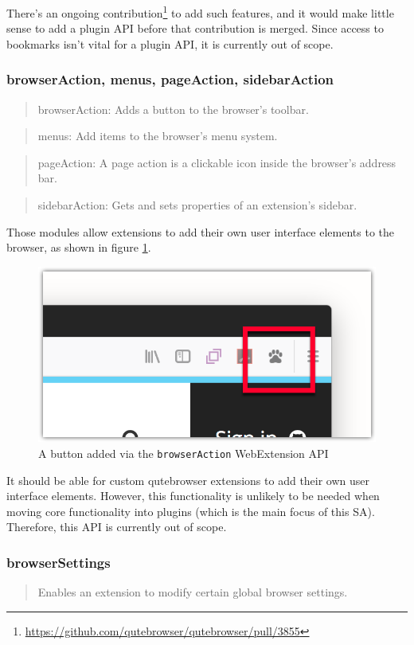 \documentclass[a4paper,parskip=full]{scrreprt}
\begin{document}
There's an ongoing
contribution\footnote{\url{https://github.com/qutebrowser/qutebrowser/pull/3855}}
to add such features, and it would make little sense to add a plugin API before
that contribution is merged. Since access to bookmarks isn't vital for a plugin
API, it is currently out of scope.

\subsubsection{browserAction, menus, pageAction, sidebarAction}
\begin{quote}
browserAction: Adds a button to the browser's toolbar.
\end{quote}
\begin{quote}
menus: Add items to the browser's menu system.
\end{quote}
\begin{quote}
pageAction: A page action is a clickable icon inside the browser's address bar.
\end{quote}
\begin{quote}
sidebarAction: Gets and sets properties of an extension's sidebar.
\end{quote}

Those modules allow extensions to add their own user interface elements to the
browser, as shown in figure \ref{img:browser-action}.

\begin{figure}[h]
  \centering
  \includegraphics[width=0.5\linewidth]{img/browser-action.png}
  \caption{A button added via the \texttt{browserAction} WebExtension API}
  \label{img:browser-action}
\end{figure}

It should be able for custom qutebrowser extensions to add their own user
interface elements. However, this functionality is unlikely to be needed
when moving core functionality into plugins (which is the main focus of this
SA). Therefore, this API is currently out of scope.

\subsubsection{browserSettings}
\begin{quote}
Enables an extension to modify certain global browser settings.
\end{quote}
\end{document}
